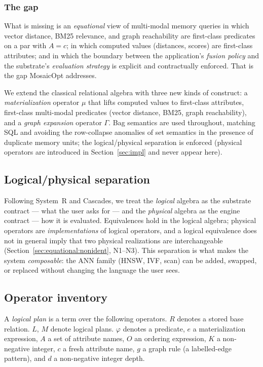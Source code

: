 \documentclass[acmsmall,review,anonymous]{acmart}
\theoremstyle{plain}
\theoremstyle{definition}
\theoremstyle{remark}
\begin{document}
\subsubsection*{The gap}

What is missing is an \emph{equational} view of multi-modal memory
queries in which vector distance, BM25 relevance, and graph
reachability are first-class predicates on a par with $A = c$; in
which computed values (distances, scores) are first-class attributes;
and in which the boundary between the application's \emph{fusion
policy} and the substrate's \emph{evaluation strategy} is explicit
and contractually enforced. That is the gap MosaicOpt addresses.

We extend the classical relational algebra with three new kinds of
construct: a \emph{materialization} operator $\mu$ that lifts computed
values to first-class attributes, first-class multi-modal predicates
(vector distance, BM25, graph reachability), and a \emph{graph
expansion} operator $\Gamma$. Bag semantics are used throughout,
matching SQL and avoiding the row-collapse anomalies of set semantics
in the presence of duplicate memory units; the logical/physical
separation is enforced (physical operators are introduced in
Section~\ref{sec:impl} and never appear here).

\subsection{Logical/physical separation}

Following System~R and Cascades, we treat the \emph{logical} algebra
as the substrate contract --- what the user asks for --- and the
\emph{physical} algebra as the engine contract --- how it is
evaluated. Equivalences hold in the logical algebra; physical
operators are \emph{implementations} of logical operators, and a
logical equivalence does not in general imply that two physical
realizations are interchangeable (Section~\ref{sec:equational:nonident},
N1--N3). This separation is what makes the system \emph{composable}:
the ANN family (HNSW, IVF, scan) can be added, swapped, or replaced
without changing the language the user sees.

\subsection{Operator inventory}

A \emph{logical plan} is a term over the following operators. $R$
denotes a stored base relation. $L$, $M$ denote logical plans.
$\varphi$ denotes a predicate, $e$ a materialization expression, $A$
a set of attribute names, $O$ an ordering expression, $K$ a
non-negative integer, $c$ a fresh attribute name, $g$ a graph rule
(a labelled-edge pattern), and $d$ a non-negative integer depth.
\end{document}
